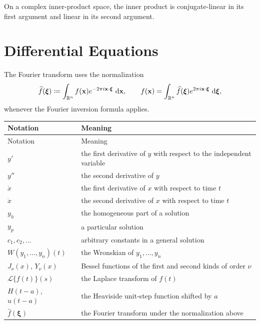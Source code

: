     On a complex inner-product space, the inner product is conjugate-linear in
    its first argument and linear in its second argument.

    \section*{Differential Equations}

    The Fourier transform uses the normalization
    \[
        \widehat f(\boldsymbol{\xi})
        \coloneqq
        \int_{\mathbb{R}^n}f(\mathbf{x})e^{-2\pi i\mathbf{x}\cdot\boldsymbol{\xi}}\,\mathop{}\!\mathrm{d}\mathbf{x},
        \qquad
        f(\mathbf{x})
        =
        \int_{\mathbb{R}^n}\widehat f(\boldsymbol{\xi})e^{2\pi i\mathbf{x}\cdot\boldsymbol{\xi}}\,\mathop{}\!\mathrm{d}\boldsymbol{\xi},
    \]
    whenever the Fourier inversion formula applies.

    {\small
    \renewcommand{\arraystretch}{1.18}
    \begin{longtable}{@{}L{0.27\textwidth}L{0.65\textwidth}@{}}
        \toprule
        Notation & Meaning \\
        \midrule
        \endfirsthead

        \toprule
        Notation & Meaning \\
        \midrule
        \endhead

        \bottomrule
        \endlastfoot

        $y'$ & the first derivative of $y$ with respect to the independent variable \\
        $y''$ & the second derivative of $y$ \\
        $\dot{x}$ & the first derivative of $x$ with respect to time $t$ \\
        $\ddot{x}$ & the second derivative of $x$ with respect to time $t$ \\
        $y_h$ & the homogeneous part of a solution \\
        $y_p$ & a particular solution \\
        $c_1,c_2,\dots$ & arbitrary constants in a general solution \\
        $W(y_1,\dots,y_n)(t)$ & the Wronskian of $y_1,\dots,y_n$ \\
        $J_\nu(x)$, $Y_\nu(x)$ & Bessel functions of the first and second kinds of order $\nu$ \\
        $\mathcal{L}\{f(t)\}(s)$ & the Laplace transform of $f(t)$ \\
        $H(t-a)$, $u(t-a)$ & the Heaviside unit-step function shifted by $a$ \\
        $\widehat f(\boldsymbol{\xi})$ & the Fourier transform under the normalization above \\
    \end{longtable}
    }

